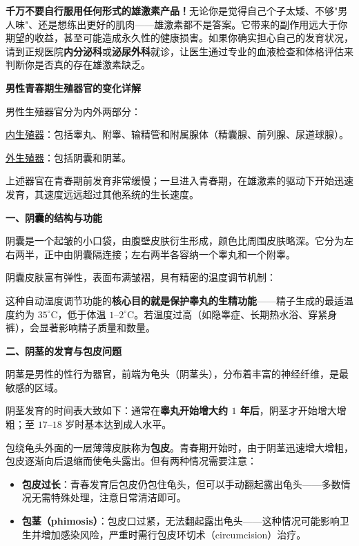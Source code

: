 \begin{enumerate}
\begin{tcolorbox}[colback=pink!5!white,colframe=red!50!black,title=贴心小叮咛]
\textbf{千万不要自行服用任何形式的雄激素产品！}无论你是觉得自己个子太矮、不够"男人味"、还是想练出更好的肌肉——雄激素都不是答案。它带来的副作用远大于你期望的收益，甚至可能造成永久性的健康损害。如果你确实担心自己的发育状况，请到正规医院\textbf{内分泌科}或\textbf{泌尿外科}就诊，让医生通过专业的血液检查和体格评估来判断你是否真的存在雄激素缺乏。
\end{tcolorbox}

\vspace{0.8em}
\noindent\textbf{男性青春期生殖器官的变化详解}

男性生殖器官分为内外两部分：

\underline{内生殖器}：包括睾丸、附睾、输精管和附属腺体（精囊腺、前列腺、尿道球腺）。

\underline{外生殖器}：包括阴囊和阴茎。

上述器官在青春期前发育非常缓慢；一旦进入青春期，在雄激素的驱动下开始迅速发育，其速度远远超过其他系统的生长速度。

\vspace{0.3em}
\noindent\textbf{一、阴囊的结构与功能}

阴囊是一个起皱的小口袋，由腹壁皮肤衍生形成，颜色比周围皮肤略深。它分为左右两半，正中由阴囊隔连接；左右两半各容纳一个睾丸和一个附睾。

阴囊皮肤富有弹性，表面布满皱褶，具有精密的温度调节机制：
\begin{itemize}
	\item \textbf{气温高时}：阴囊松弛，皮肤展开，皮脂腺和汗腺分泌旺盛以加速散热
	\item {}}：阴囊收缩，减少散热面积，并向身体靠拢以获取体温
\end{itemize}

这种自动温度调节功能的\textbf{核心目的就是保护睾丸的生精功能}——精子生成的最适温度约为 $35^\circ\text{C}$，低于体温 $1$--$2^\circ\text{C}$。若温度过高（如隐睾症、长期热水浴、穿紧身裤），会显著影响精子质量和数量。

\vspace{0.3em}
\noindent\textbf{二、阴茎的发育与包皮问题}

阴茎是男性的性行为器官，前端为龟头（阴茎头），分布着丰富的神经纤维，是最敏感的区域。

阴茎发育的时间表大致如下：通常在\textbf{睾丸开始增大约 $1$ 年后}，阴茎才开始增大增粗；至 $17$--$18$ 岁时基本达到成人水平。

包绕龟头外面的一层薄薄皮肤称为\textbf{包皮}。青春期开始时，由于阴茎迅速增大增粗，包皮逐渐向后退缩而使龟头露出。但有两种情况需要注意：
\begin{itemize}
	\item \textbf{包皮过长}：青春发育后包皮仍包住龟头，但可以手动翻起露出龟头——多数情况无需特殊处理，注意日常清洁即可。
	\item \textbf{包茎（phimosis）}：包皮口过紧，无法翻起露出龟头——这种情况可能影响卫生并增加感染风险，严重时需行包皮环切术（circumcision）治疗。
\end{itemize}


\end{enumerate}

